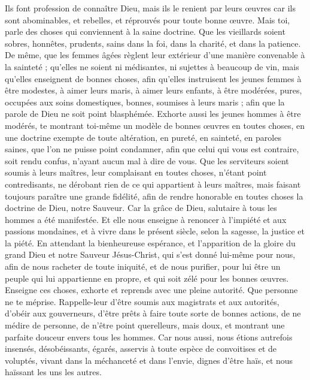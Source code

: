 \begin{multicols}{2}
Ils font profession de connaître Dieu, mais ils le renient par leurs œuvres car ils sont abominables, et rebelles, et réprouvés pour toute bonne œuvre.
\VerseOne{}Mais toi, parle des choses qui conviennent à la saine doctrine.
Que les vieillards soient sobres, honnêtes, prudents, sains dans la foi, dans la charité, et dans la patience.
De même, que les femmes âgées règlent leur extérieur d'une manière convenable à la sainteté ; qu'elles ne soient ni médisantes, ni sujettes à beaucoup de vin, mais qu'elles enseignent de bonnes choses,
afin qu'elles instruisent les jeunes femmes à être modestes, à aimer leurs maris, à aimer leurs enfants,
à être modérées, pures, occupées aux soins domestiques, bonnes, soumises à leurs maris ; afin que la parole de Dieu ne soit point blasphémée.
Exhorte aussi les jeunes hommes à être modérés,
te montrant toi-même un modèle de bonnes œuvres en toutes choses, en une doctrine exempte de toute altération, en pureté, en sainteté,
en paroles saines, que l’on ne puisse point condamner, afin que celui qui vous est contraire, soit rendu confus, n’ayant aucun mal à dire de vous.
Que les serviteurs soient soumis à leurs maîtres, leur complaisant en toutes choses, n’étant point contredisants,
ne dérobant rien de ce qui appartient à leurs maîtres, mais faisant toujours paraître une grande fidélité, afin de rendre honorable en toutes choses la doctrine de Dieu, notre Sauveur.
Car la grâce de Dieu, salutaire à tous les hommes a été manifestée.
Et elle nous enseigne à renoncer à l'impiété et aux passions mondaines, et à vivre dans le présent siècle, selon la sagesse, la justice et la piété.
En attendant la bienheureuse espérance, et l'apparition de la gloire du grand Dieu et notre Sauveur Jésus-Christ,
qui s'est donné lui-même pour nous, afin de nous racheter de toute iniquité, et de nous purifier, pour lui être un peuple qui lui appartienne en propre, et qui soit zélé pour les bonnes œuvres.
Enseigne ces choses, exhorte et reprends avec une pleine autorité. Que personne ne te méprise.
\VerseOne{}Rappelle-leur d'être soumis aux magistrats et aux autorités, d'obéir aux gouverneurs, d'être prêts à faire toute sorte de bonnes actions,
de ne médire de personne, de n'être point querelleurs, mais doux, et montrant une parfaite douceur envers tous les hommes.
Car nous aussi, nous étions autrefois insensés, désobéissants, égarés, asservis à toute espèce de convoitises et de voluptés, vivant dans la méchanceté et dans l’envie, dignes d’être haïs, et nous haïssant les uns les autres.

\end{multicols}
